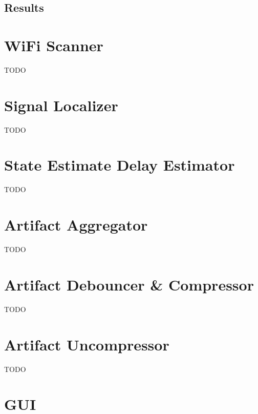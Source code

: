 \subsection{Results}

\section{WiFi Scanner}

TODO

\section{Signal Localizer}

TODO

\section{State Estimate Delay Estimator}

TODO

\section{Artifact Aggregator}

TODO

\section{Artifact Debouncer \& Compressor}

TODO

\section{Artifact Uncompressor}

TODO

\section{GUI}